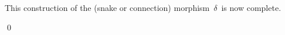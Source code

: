 \begin{enumerate}
	\vskip 0.3cm
	This construction of the (snake or connection) morphism \,$\delta$\, is now complete.
\end{enumerate}
\qed

